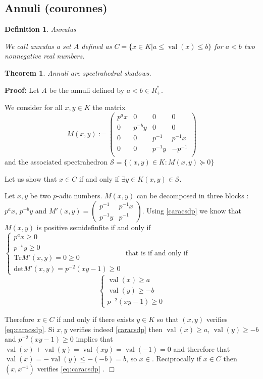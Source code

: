 \documentclass[a4paper,12pt]{article}
\newenvironment{proof}{\hbox{}\vspace{-0.8cm} {\bf Proof:}}{\hfill $\Box$}
\newtheorem{theorem}{Theorem}[section]
\newtheorem{definition}{Definition}
\DeclareMathOperator{\val}{val}
\begin{document}
\subsection{Annuli (couronnes)}
\begin{definition}
	Annulus
	
	We call \emph{annulus} a set $A$ defined as $C = \{x \in K  | a\le \val(x) \le b\} $ for $a < b$ two nonnegative real numbers.
\end{definition}

\begin{theorem}
Annuli are spectrahedral shadows.
\end{theorem} 

\begin{proof}
Let $A$ be the annuli defined by $a<b \in R^*_+$.

We consider for all $x,y \in K $ the matrix  $$M(x,y) :=
\begin{pmatrix} 
	p^ax & 0 & 0 & 0 \\
	0 & p^{-b}y & 0 & 0 \\
	0 & 0 & p^{-1} & p^{-1}x \\
	0 & 0 & p^{-1}y & - p^{-1}  \\
\end{pmatrix} $$ and the associated spectrahedron $\mathcal{S}= \{(x,y) \in K  : M(x,y) \succeq 0\} $

Let us show that $x \in C$ if and only if  $\exists y \in K(x,y) \in \mathcal{S}$.

Let $x,y$ be two $p$-adic numbers.
$M(x,y)$ can be decomposed in three blocks : $p^ax$, $p^{-b}y $ and $M'(x,y) = \begin{pmatrix} p^{-1} & p^{-1}x \\ p^{-1} y & p^{-1}\end{pmatrix} $. Using \ref{caracsdp} we know that $M(x,y)$ is positive semidefinfite if and only if
$
\begin{cases}
  p^ax \ge 0 \\
  p^{-b}y \ge 0\\
  \text{Tr}M'\left( x,y \right) = 0 \ge 0\\
  \text{det} M'(x,y ) = p^{-2}\left( xy-1 \right)  \ge 0 
\end{cases}
$ 
that is if and only if 
\begin{equation}
	\label{eq:caracsdp} 
	\begin{cases} 
		\val\left(x\right)\ge a\\
		\val\left(y\right)\ge -b\\
		p^{-2} \left( xy-1 \right) \ge 0
	\end{cases}
\end{equation}

Therefore $x \in C$ if and only if there exists $y \in K $ so that $(x, y)$ verifies \ref{eq:caracsdp}. Si $x, y$ verifies indeed \ref{caracsdp} then $\val\left(x\right)\ge a$, $\val\left(y\right)\ge -b$ and $p^{-2} \left( xy-1 \right) \ge 0$ implies that $\val\left(x\right)+\val\left(y\right)=\val\left(xy\right) = \val\left(-1\right) =0$ and therefore that $\val\left(x\right)=-\val\left(y\right)\le -(-b)  =b$, so $x \in $. Reciprocally if $x \in C$ then $(x,x^{-1}) $ verifies \ref{eq:caracsdp}  .
\end{proof}
\end{document}
